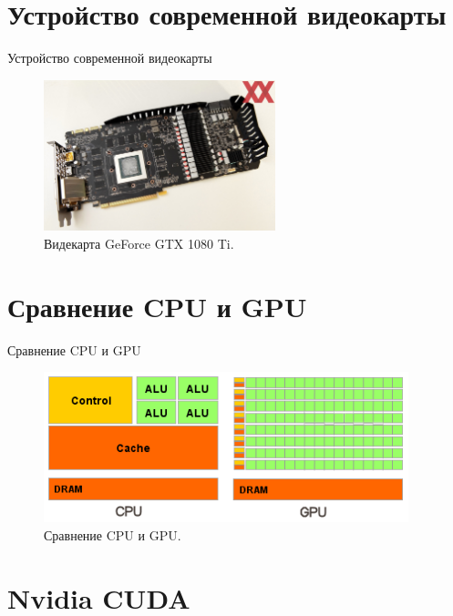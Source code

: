 \documentclass{beamer}
\begin{document}
\section{Устройство современной видеокарты}

\begin{frame}{Устройство современной видеокарты}

\begin{figure}
\center
\includegraphics[width=0.6\textwidth]{Images/417-3.jpg}
\caption{\label{fig:GTX1080}Видекарта GeForce GTX 1080 Ti.}
\end{figure}

\end{frame}

\section{Сравнение CPU и GPU}

\begin{frame}{Сравнение CPU и GPU}

\begin{figure}
\center
\includegraphics[width=\textwidth]{Images/cpu_vs_gpu.png}
\caption{\label{fig:CPUvsGPU}Сравнение CPU и GPU.}
\end{figure}

\end{frame}

\section{Nvidia CUDA}
\end{document}
